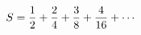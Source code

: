 \documentclass[preview]{standalone}
\begin{document}
\begin{align*}
\special{dvisvgm:raw <g id='unique000'>}S=\dfrac{1}{2}+\dfrac{2}{4}+\dfrac{3}{8}+\dfrac{4}{16}+\cdots\special{dvisvgm:raw </g>}
\end{align*}
\end{document}

